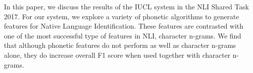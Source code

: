 In this paper, we discuss the results of the IUCL system in the NLI Shared Task 2017. For our system, we explore a variety of phonetic algorithms to generate features for Native Language Identification. These features are contrasted with one of the most successful type of features in NLI, character n-grams. We find that although phonetic features do not perform as well as character n-grams alone, they do increase overall F1 score when used together with character n-grams.
